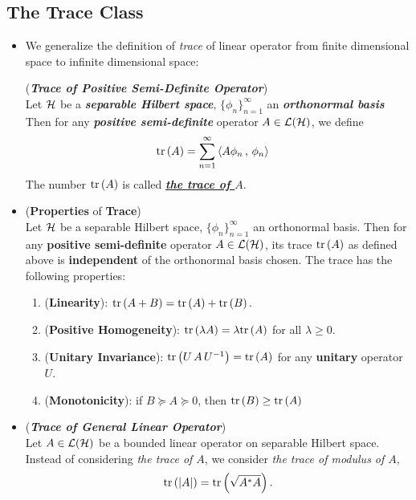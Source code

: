 \documentclass[11pt]{article}
\begin{document}
\subsection{The Trace Class}
\begin{itemize}
\item We generalize the definition of \emph{trace} of linear operator from finite dimensional space to infinite dimensional space:
\begin{definition} (\emph{\textbf{Trace of Positive Semi-Definite Operator}})\\
Let ${\mathcal H}$ be a \textbf{\emph{separable Hilbert space}}, $\{\phi_n\}_{n=1}^{\infty}$ an \textbf{\emph{orthonormal basis}} Then  for any \textbf{\emph{positive semi-definite}} operator $A \in {\mathcal L}({\mathcal H})$, we define
\begin{align*}
\mathrm{tr}\left(A \right) &= \sum_{n=1}^{\infty}\left\langle A\phi_n\,,\, \phi_n \right\rangle
\end{align*} The number $\mathrm{tr}\left(A \right)$ is called \underline{\textbf{\emph{the trace of $A$}}}.
\end{definition} 

\item \begin{proposition} (\textbf{Properties} of \textbf{Trace}) \citep{reed1980methods}\\
Let ${\mathcal H}$ be a separable Hilbert space, $\{\phi_n\}_{n=1}^{\infty}$ an orthonormal basis. Then  for any \textbf{positive semi-definite} operator $A \in {\mathcal L}({\mathcal H})$,  its trace $\mathrm{tr}\left(A \right)$ as defined above is \textbf{independent} of the orthonormal basis chosen. The trace has the following properties: 
\begin{enumerate}
\item (\textbf{Linearity}): $\mathrm{tr}\left(A + B \right) = \mathrm{tr}\left(A \right) + \mathrm{tr}\left(B \right).$
\item (\textbf{Positive Homogeneity}): $\mathrm{tr}\left(\lambda A \right) = \lambda \mathrm{tr}\left(A \right)$ for all $\lambda \ge 0$.
\item (\textbf{Unitary Invariance}): $\mathrm{tr}\left(U\,A\,U^{-1} \right) = \mathrm{tr}\left(A \right)$ for any \textbf{unitary} operator $U$. 
\item (\textbf{Monotonicity}): if $B\succeq A \succeq 0$, then $\mathrm{tr}\left(B \right) \ge \mathrm{tr}\left(A \right)$
\end{enumerate}
\end{proposition}

\item \begin{remark} (\emph{\textbf{Trace of General Linear Operator}})\\
Let $A \in {\mathcal L}({\mathcal H})$ be a bounded linear operator on separable Hilbert space. Instead of considering \emph{the trace of $A$}, we consider \emph{the trace of modulus of $A$},
\begin{align*}
\mathrm{tr}\left(\left\lvert A \right\rvert \right) = \mathrm{tr}\left(\sqrt{A^{*}A} \right).
\end{align*}
\end{remark}


\end{itemize}
\end{document}
